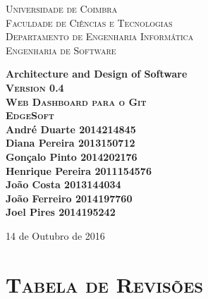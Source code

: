 \documentclass[12pt]{article}
\begin{document}
 
\begin{titlepage}
\begin{center}

\textsc{\footnotesize Universidade de Coimbra }\\[0.1cm]
\textsc{\footnotesize Faculdade de Ciências e Tecnologias}  \\[0.1cm]
\textsc{\footnotesize Departamento de Engenharia Informática }\\[0.2cm]
\textsc{\footnotesize Engenharia de Software }\\[2cm]




{\Large \bfseries Architecture and Design of Software\\[1.5cm]

\textsc{\normalsize Version 0.4}\\[.2cm]
\textsc{\normalsize Web Dashboard para o Git}\\[2cm]
\textsc{\fontsize{2cm}{2.5cm}\selectfont EdgeSoft}\\[5cm]


\small
André Duarte \hfill 2014214845\\ 
Diana Pereira \hfill 2013150712\\
Gonçalo Pinto \hfill 2014202176\\
Henrique Pereira \hfill 2011154576\\
João Costa \hfill 2013144034\\
João Ferreiro \hfill 2014197760\\
Joel Pires \hfill 2014195242\\



\begin{minipage}{0\textwidth}
\begin{flushright} \large
\end{flushright}
\end{minipage}

\vfill
{\normalsize 14 de Outubro de 2016}
}

\end{center}
\end{titlepage}


\pagebreak

\tableofcontents

\pagebreak

\section{ \textsc{Tabela de Revisões}}
\end{document}

